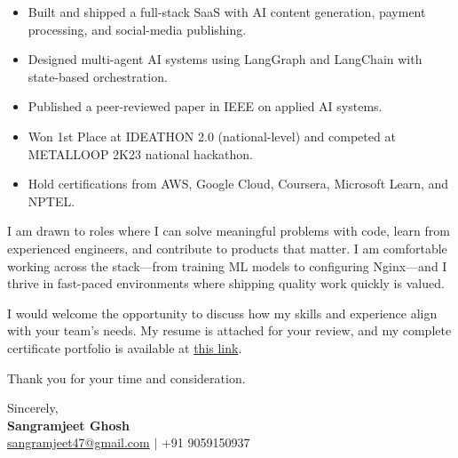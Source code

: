 \documentclass[11pt]{article}
\begin{document}
\begin{itemize}
\setlength{\itemsep}{4pt}
\item Built and shipped a full-stack SaaS with AI content generation, payment processing, and social-media publishing.
\item Designed multi-agent AI systems using LangGraph and LangChain with state-based orchestration.
\item Published a peer-reviewed paper in IEEE on applied AI systems.
\item Won 1st Place at IDEATHON 2.0 (national-level) and competed at METALLOOP 2K23 national hackathon.
\item Hold certifications from AWS, Google Cloud, Coursera, Microsoft Learn, and NPTEL.
\end{itemize}

I am drawn to roles where I can solve meaningful problems with code, learn from experienced engineers, and contribute to products that matter. I am comfortable working across the stack---from training ML models to configuring Nginx---and I thrive in fast-paced environments where shipping quality work quickly is valued.

I would welcome the opportunity to discuss how my skills and experience align with your team's needs. My resume is attached for your review, and my complete certificate portfolio is available at \href{https://drive.google.com/drive/folders/1ZQd-DeX-rXlEVDTwDJfjLjnG7iPc_fEw}{this link}.

Thank you for your time and consideration.

\vspace{20pt}

\noindent Sincerely, \\[4pt]
\textbf{Sangramjeet Ghosh} \\
\href{mailto:sangramjeet47@gmail.com}{sangramjeet47@gmail.com} \quad $|$ \quad +91 9059150937
\end{document}
